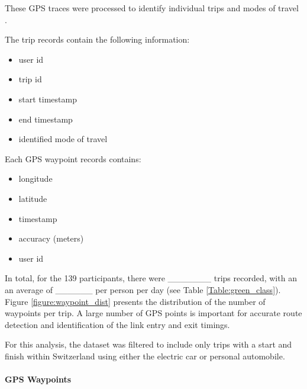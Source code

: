  These GPS traces were processed to identify individual trips and modes of travel \cite{rabaul2016greenclassprocessing}.

The trip records contain the following information:
\begin{itemize}
  \item user id
  \item trip id
  \item start timestamp
  \item end timestamp
  \item identified mode of travel
\end{itemize}

Each GPS waypoint records contains: 
\begin{itemize}
  \item longitude
  \item latitude
  \item timestamp
  \item accuracy (meters)
  \item user id
\end{itemize}


In total, for the 139 participants, there were _______ trips recorded, with an an average of ______ per person per day (see Table \ref{Table:green_class}). 
Figure \ref{figure:waypoint_dist} presents the distribution of the number of waypoints per trip. 
A large number of GPS points is important for accurate route detection and identification of the link entry and exit timings.

For this analysis, the dataset was filtered to include only trips with a start and finish within Switzerland using either the electric car or personal automobile. 




\paragraph{GPS Waypoints}

